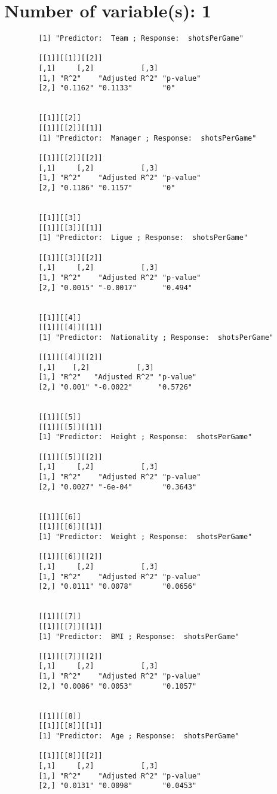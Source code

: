 \documentclass[12pt]{article}
\title{}
\author{}
\date{}
\begin{document}
	\section{Number of variable(s): 1}
	\begin{verbatim}
		[1] "Predictor:  Team ; Response:  shotsPerGame"
		
		[[1]][[1]][[2]]
		[,1]     [,2]           [,3]     
		[1,] "R^2"    "Adjusted R^2" "p-value"
		[2,] "0.1162" "0.1133"       "0"      
		
		
		[[1]][[2]]
		[[1]][[2]][[1]]
		[1] "Predictor:  Manager ; Response:  shotsPerGame"
		
		[[1]][[2]][[2]]
		[,1]     [,2]           [,3]     
		[1,] "R^2"    "Adjusted R^2" "p-value"
		[2,] "0.1186" "0.1157"       "0"      
		
		
		[[1]][[3]]
		[[1]][[3]][[1]]
		[1] "Predictor:  Ligue ; Response:  shotsPerGame"
		
		[[1]][[3]][[2]]
		[,1]     [,2]           [,3]     
		[1,] "R^2"    "Adjusted R^2" "p-value"
		[2,] "0.0015" "-0.0017"      "0.494"  
		
		
		[[1]][[4]]
		[[1]][[4]][[1]]
		[1] "Predictor:  Nationality ; Response:  shotsPerGame"
		
		[[1]][[4]][[2]]
		[,1]    [,2]           [,3]     
		[1,] "R^2"   "Adjusted R^2" "p-value"
		[2,] "0.001" "-0.0022"      "0.5726" 
		
		
		[[1]][[5]]
		[[1]][[5]][[1]]
		[1] "Predictor:  Height ; Response:  shotsPerGame"
		
		[[1]][[5]][[2]]
		[,1]     [,2]           [,3]     
		[1,] "R^2"    "Adjusted R^2" "p-value"
		[2,] "0.0027" "-6e-04"       "0.3643" 
		
		
		[[1]][[6]]
		[[1]][[6]][[1]]
		[1] "Predictor:  Weight ; Response:  shotsPerGame"
		
		[[1]][[6]][[2]]
		[,1]     [,2]           [,3]     
		[1,] "R^2"    "Adjusted R^2" "p-value"
		[2,] "0.0111" "0.0078"       "0.0656" 
		
		
		[[1]][[7]]
		[[1]][[7]][[1]]
		[1] "Predictor:  BMI ; Response:  shotsPerGame"
		
		[[1]][[7]][[2]]
		[,1]     [,2]           [,3]     
		[1,] "R^2"    "Adjusted R^2" "p-value"
		[2,] "0.0086" "0.0053"       "0.1057" 
		
		
		[[1]][[8]]
		[[1]][[8]][[1]]
		[1] "Predictor:  Age ; Response:  shotsPerGame"
		
		[[1]][[8]][[2]]
		[,1]     [,2]           [,3]     
		[1,] "R^2"    "Adjusted R^2" "p-value"
		[2,] "0.0131" "0.0098"       "0.0453" 
		

\end{verbatim}
\end{document}
